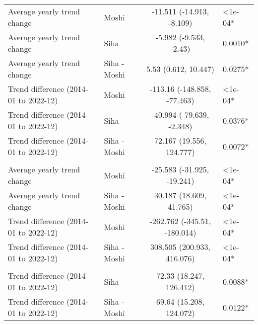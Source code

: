 \begin{longtable}{l|lcl}
\midrule\addlinespace[2.5pt]
Average yearly trend change & Moshi & -11.511 (-14.913, -8.109) & <1e-04* \\ 
Average yearly trend change & Siha & -5.982 (-9.533, -2.43) & 0.0010* \\ 
Average yearly trend change & Siha - Moshi & 5.53 (0.612, 10.447) & 0.0275* \\ 
Trend difference (2014-01 to 2022-12) & Moshi & -113.16 (-148.858, -77.463) & <1e-04* \\ 
Trend difference (2014-01 to 2022-12) & Siha & -40.994 (-79.639, -2.348) & 0.0376* \\ 
Trend difference (2014-01 to 2022-12) & Siha - Moshi & 72.167 (19.556, 124.777) & 0.0072* \\ 
\midrule\addlinespace[2.5pt]
\multicolumn{4}{l}{Other Communicable Diseases} \\ 
\midrule\addlinespace[2.5pt]
Average yearly trend change & Moshi & -25.583 (-31.925, -19.241) & <1e-04* \\ 
Average yearly trend change & Siha - Moshi & 30.187 (18.609, 41.765) & <1e-04* \\ 
Trend difference (2014-01 to 2022-12) & Moshi & -262.762 (-345.51, -180.014) & <1e-04* \\ 
Trend difference (2014-01 to 2022-12) & Siha - Moshi & 308.505 (200.933, 416.076) & <1e-04* \\ 
\midrule\addlinespace[2.5pt]
\multicolumn{4}{l}{Cancer} \\ 
\midrule\addlinespace[2.5pt]
Trend difference (2014-01 to 2022-12) & Siha & 72.33 (18.247, 126.412) & 0.0088* \\ 
Trend difference (2014-01 to 2022-12) & Siha - Moshi & 69.64 (15.208, 124.072) & 0.0122* \\ 
\bottomrule
\end{longtable}

